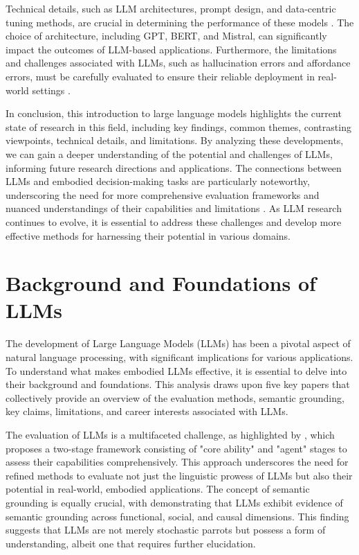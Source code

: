 \documentclass[conference]{IEEEtran}
\begin{document}
Technical details, such as LLM architectures, prompt design, and data-centric tuning methods, are crucial in determining the performance of these models \cite{b4}. The choice of architecture, including GPT, BERT, and Mistral, can significantly impact the outcomes of LLM-based applications. Furthermore, the limitations and challenges associated with LLMs, such as hallucination errors and affordance errors, must be carefully evaluated to ensure their reliable deployment in real-world settings \cite{b5}.

In conclusion, this introduction to large language models highlights the current state of research in this field, including key findings, common themes, contrasting viewpoints, technical details, and limitations. By analyzing these developments, we can gain a deeper understanding of the potential and challenges of LLMs, informing future research directions and applications. The connections between LLMs and embodied decision-making tasks are particularly noteworthy, underscoring the need for more comprehensive evaluation frameworks and nuanced understandings of their capabilities and limitations \cite{b5}. As LLM research continues to evolve, it is essential to address these challenges and develop more effective methods for harnessing their potential in various domains.

\section{Background and Foundations of LLMs}
The development of Large Language Models (LLMs) has been a pivotal aspect of natural language processing, with significant implications for various applications. To understand what makes embodied LLMs effective, it is essential to delve into their background and foundations. This analysis draws upon five key papers that collectively provide an overview of the evaluation methods, semantic grounding, key claims, limitations, and career interests associated with LLMs.

The evaluation of LLMs is a multifaceted challenge, as highlighted by \cite{aSurveyOfUsefulLLMEvaluation}, which proposes a two-stage framework consisting of "core ability" and "agent" stages to assess their capabilities comprehensively. This approach underscores the need for refined methods to evaluate not just the linguistic prowess of LLMs but also their potential in real-world, embodied applications. The concept of semantic grounding is equally crucial, with \cite{understandingAISemanticGroundingInLargeLanguageModels} demonstrating that LLMs exhibit evidence of semantic grounding across functional, social, and causal dimensions. This finding suggests that LLMs are not merely stochastic parrots but possess a form of understanding, albeit one that requires further elucidation.
\end{document}
